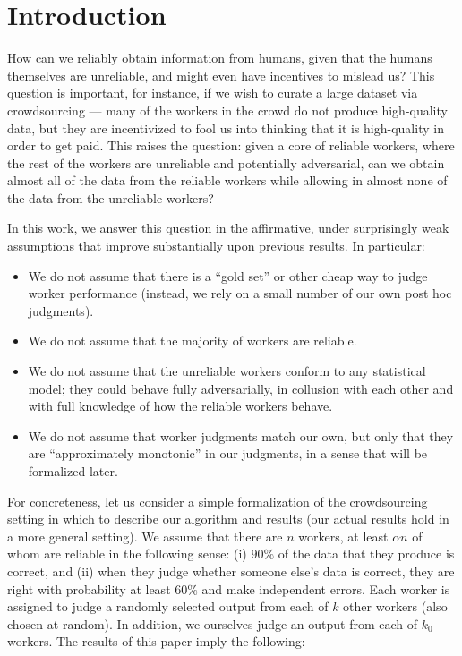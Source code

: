 \section{Introduction}
\label{sec:intro}


How can we reliably obtain information from humans, given that the humans 
themselves are unreliable, and might even have incentives to mislead us?
This question is important, for instance, if we wish to curate a large 
dataset via crowdsourcing --- many of the workers in the crowd do not produce 
high-quality data, but they are incentivized to fool us into thinking that 
it is high-quality in order to get paid. This raises the question: given a 
core of reliable workers, where the rest of the workers are unreliable and 
potentially adversarial, can we obtain almost all of the data from the 
reliable workers while allowing in almost none of the data from the 
unreliable workers?

In this work, we answer this question in the affirmative, under surprisingly 
weak assumptions that improve substantially upon previous results. 
In particular:
\begin{itemize}
\item We do not assume that there is a ``gold set'' or other cheap way to judge 
      worker performance (instead, we rely on a small number of our own post hoc judgments).
\item We do not assume that the majority of workers are reliable.
\item We do not assume that the unreliable workers conform to any statistical 
      model; they could behave fully adversarially, in collusion with each other 
      and with full knowledge of how the reliable workers behave.
\item We do not assume that worker judgments match our own, but only that they are 
      ``approximately monotonic'' in our judgments, in a sense that will be 
      formalized later.
\end{itemize}
For concreteness, let us consider a simple formalization of the crowdsourcing 
setting in which to describe our algorithm and results (our actual results hold 
in a more general setting). We assume that there are $n$ workers, at least 
$\alpha n$ of whom are reliable in the following sense: (i) $90\%$ of the data 
that they produce is correct, and (ii) when they judge whether someone else's data 
is correct, they are right with probability at least $60\%$ and make independent 
errors. Each worker is assigned to judge a randomly selected output from each 
of $k$ other workers (also chosen at random). In addition, we ourselves judge 
an output from each of $k_0$ workers. The results of this paper imply the 
following:

